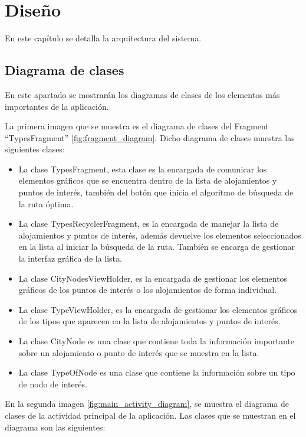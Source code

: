 \chapter{Diseño}
En este capítulo se detalla la arquitectura del sistema.
\section[Diagrama de clases]{Diagrama de clases}
En este apartado se mostrarán los diagramas de clases de los elementos más importantes de la aplicación.\newline

La primera imagen que se muestra es el diagrama de clases del Fragment \enquote{TypesFragment} \ref{fig:fragment_diagram}. Dicho diagrama de clases muestra las siguientes clases:
\begin{itemize}
	\item La clase TypesFragment, esta clase es la encargada de comunicar los elementos gráficos que se encuentra dentro de la lista de alojamientos y puntos de interés, también del botón que inicia el algoritmo de búsqueda de la ruta óptima.
	\item La clase TypesRecyclerFragment, es la encargada de manejar la lista de alojamientos y puntos de interés, además devuelve los elementos seleccionados en la lista al iniciar la búsqueda de la ruta. También se encarga de gestionar la interfaz gráfica de la lista.
	\item La clase CityNodesViewHolder, es la encargada de gestionar los elementos gráficos de los puntos de interés o los alojamientos de forma individual.
	\item La clase TypeViewHolder, es la encargada de gestionar los elementos gráficos de los tipos que aparecen en la lista de alojamientos y puntos de interés.
	\item La clase CityNode es una clase que contiene toda la información importante sobre un alojamiento o punto de interés que se muestra en la lista.
	\item La clase TypeOfNode es una clase que contiene la información sobre un tipo de nodo de interés.
\end{itemize}
\vspace{0.06in}
En la segunda imagen \ref{fig:main_activity_diagram}, se muestra el diagrama de clases de la actividad principal de la aplicación. Las clases que se muestran en el diagrama son las siguientes:
